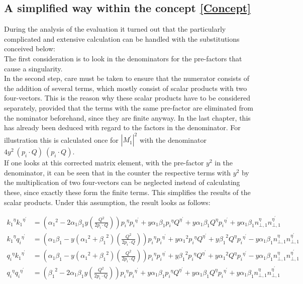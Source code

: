 \subsection{A simplified way within the concept \ref{Concept} }
During the analysis of the evaluation it turned out that the particularly complicated and extensive calculation can be handled with the substitutions conceived below:\\
The first consideration is to look in the denominators for the pre-factors that cause a singularity. \\
In the second step, care must be taken to ensure that the numerator consists of the addition of several terms, which mostly consist of scalar products with two four-vectors. This is the reason why these scalar products have to be considered separately, provided that the terms with the same pre-factor are eliminated from the nominator beforehand, since they are finite anyway.
In the last chapter, this has already been deduced with regard to the factors in the denominator. 
For illustration this is calculated once for ${|{M}^{\prime}_1|}^2$ with the denominator $ 4y^2\:(p_i\cdot Q) \:(p_i\cdot Q) $. \\
If one looks at this corrected matrix element, with the pre-factor $ y^2 $ in the denominator, it can be seen that in the counter the respective terms with $ y^2 $ by the multiplication of two four-vectors can be neglected instead of calculating these, since exactly these form the finite terms. This simplifies the results of the scalar products. Under this assumption, the result looks as follows:

\begin{equation}
\begin{split}
{k_1}^{{\eta}}{k_1}^{{\eta}^{\prime}}&=({\alpha_1}^2 -2\alpha_1 \beta_1 y(\frac{Q^2}{2 p_i \cdot Q})){p_i}^{{\eta}}{p_i}^{{\eta}^{\prime}}+y\alpha_1 \beta_1 {p_i}^{{\eta}}{Q}^{{\eta}^{\prime}}+y\alpha_1 \beta_1 {Q}^{{\eta}}{p_i}^{{\eta}^{\prime}}+y\alpha_1\beta_1 {n}^{{\eta}}_{\bot,1}{n}^{{\eta}^{\prime}}_{\bot,1}\\
{k_1}^{{\eta}}{q_i}^{{\eta}^{\prime}}&=({\alpha_1}\beta_1 -y({\alpha_1}^2 + {\beta_1}^2 )(\frac{Q^2}{2 p_i \cdot Q})){p_i}^{{\eta}}{p_i}^{{\eta}^{\prime}}+y{\alpha_1}^2 {p_i}^{{\eta}}{Q}^{{\eta}^{\prime}}+y{\beta_1}^2 {Q}^{{\eta}}{p_i}^{{\eta}^{\prime}}-y\alpha_1\beta_1 {n}^{{\eta}}_{\bot,1}{n}^{{\eta}^{\prime}}_{\bot,1}\\
{q_i}^{{\eta}}{k_1}^{{\eta}^{\prime}}&=({\alpha_1}\beta_1 -y({\alpha_1}^2 + {\beta_1}^2 )(\frac{Q^2}{2 p_i \cdot Q})){p_i}^{{\eta}}{p_i}^{{\eta}^{\prime}}+y{\beta_1}^2 {p_i}^{{\eta}}{Q}^{{\eta}^{\prime}}+y{\alpha_1}^2 {Q}^{{\eta}}{p_i}^{{\eta}^{\prime}}-y\alpha_1\beta_1 {n}^{{\eta}}_{\bot,1}{n}^{{\eta}^{\prime}}_{\bot,1}\\
{q_i}^{{\eta}}{q_i}^{{\eta}^{\prime}}&=({\beta_1}^2 -2\alpha_1 \beta_1 y(\frac{Q^2}{2 p_i \cdot Q})){p_i}^{{\eta}}{p_i}^{{\eta}^{\prime}}+y\alpha_1 \beta_1 {p_i}^{{\eta}}{Q}^{{\eta}^{\prime}}+y\alpha_1 \beta_1 {Q}^{{\eta}}{p_i}^{{\eta}^{\prime}}+y\alpha_1\beta_1 {n}^{{\eta}}_{\bot,1}{n}^{{\eta}^{\prime}}_{\bot,1}
\end{split}
\end{equation}

